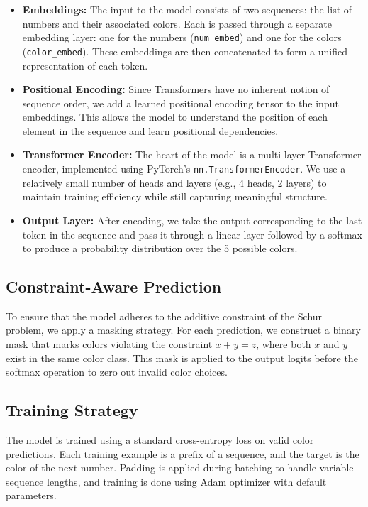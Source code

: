 \documentclass[12pt]{article}
\begin{document}
\begin{itemize}
    \item \textbf{Embeddings:} The input to the model consists of two sequences: the list of numbers and their associated colors. Each is passed through a separate embedding layer: one for the numbers (\texttt{num\_embed}) and one for the colors (\texttt{color\_embed}). These embeddings are then concatenated to form a unified representation of each token.
    
    \item \textbf{Positional Encoding:} Since Transformers have no inherent notion of sequence order, we add a learned positional encoding tensor to the input embeddings. This allows the model to understand the position of each element in the sequence and learn positional dependencies.
    
    \item \textbf{Transformer Encoder:} The heart of the model is a multi-layer Transformer encoder, implemented using PyTorch’s \texttt{nn.TransformerEncoder}. We use a relatively small number of heads and layers (e.g., 4 heads, 2 layers) to maintain training efficiency while still capturing meaningful structure.
    
    \item \textbf{Output Layer:} After encoding, we take the output corresponding to the last token in the sequence and pass it through a linear layer followed by a softmax to produce a probability distribution over the 5 possible colors.
\end{itemize}

\subsection{Constraint-Aware Prediction}

To ensure that the model adheres to the additive constraint of the Schur problem, we apply a masking strategy. For each prediction, we construct a binary mask that marks colors violating the constraint \( x + y = z \), where both \( x \) and \( y \) exist in the same color class. This mask is applied to the output logits before the softmax operation to zero out invalid color choices.

\subsection{Training Strategy}

The model is trained using a standard cross-entropy loss on valid color predictions. Each training example is a prefix of a sequence, and the target is the color of the next number. Padding is applied during batching to handle variable sequence lengths, and training is done using Adam optimizer with default parameters. 
\end{document}
